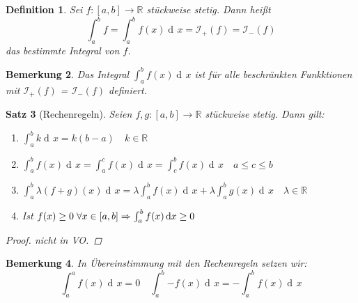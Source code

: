 \documentclass[a4paper,titlepage,oneside]{article}
\def\R{\ensuremath{\mathbb{R}} }
\newcommand{\der}{\operatorname{d\!}{}}
\def\sp{\hspace{0,1cm}}
\newcommand{\integral}[4][x]{\ensuremath{\int_{#2}^{#3}{#4\der #1}}}
\newcommand{\intAB}[2][x]{\integral[#1]{a}{b}{#2}}
\newcommand{\OI}[1]{\ensuremath{\mathcal{I}_+\left(#1\right)}}
\newcommand{\UI}[1]{\ensuremath{\mathcal{I}_-\left(#1\right)}}
\theoremstyle{thmstyle}
\newtheorem{satz}{Satz}[section]
\newtheorem{defi}[satz]{Definition}
\newtheorem{bem}[satz]{Bemerkung}
\theoremstyle{subthmstyle}
\begin{document}
\begin{defi}
Sei $f: [a,b] \to \R$ stückweise stetig. Dann heißt \[\int_{a}^{b}{f} = \intAB{f(x)} = \OI{f} = \UI{f}\] das bestimmte Integral von $f$.
\end{defi}

\begin{bem}
Das Integral \intAB{f(x)} ist für alle beschränkten Funkktionen mit \OI{f} = \UI{f} definiert.
\end{bem}

\begin{satz}[Rechenregeln]
Seien $f,g : [a,b] \to \R$ stückweise stetig. Dann gilt:
\begin{enumerate}
\item $\intAB{k} = k (b-a) \quad k \in \R$
\item $\intAB{f(x)} = \integral{a}{c}{f(x)} = \integral{c}{b}{f(x)} \quad a \le c \le b$
\item $\intAB{\lambda(f+g)(x)} = \lambda \intAB{f(x)} + \lambda \intAB{g(x)} \quad \lambda \in \R$
\item Ist $f(x) \ge 0 \sp \forall x \in [a,b] \Rightarrow \intAB{f(x)} \ge 0$
\end{enumerate}
\begin{proof}
nicht in VO. %
\end{proof}
\end{satz}

\begin{bem}
In Übereinstimmung mit den Rechenregeln setzen wir: \[\integral{a}{a}{f(x)} = 0 \quad \intAB{-f(x)} = -\intAB{f(x)}\]
\end{bem}
\end{document}
